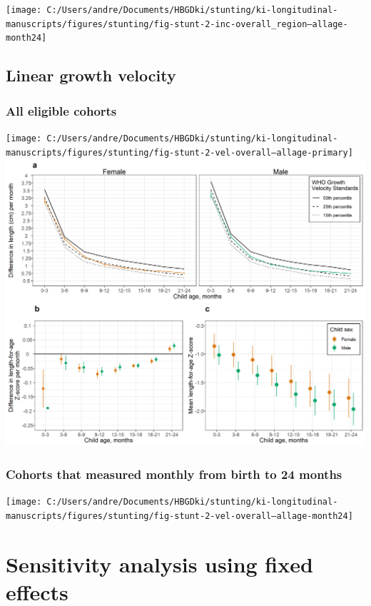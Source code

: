 \documentclass[9pt,]{book}
\begin{document}
\texttt{[image: C:/Users/andre/Documents/HBGDki/stunting/ki-longitudinal-manuscripts/figures/stunting/fig-stunt-2-inc-overall\_region--allage-month24]}

\section{Linear growth velocity}\label{linear-growth-velocity}

\subsection{All eligible cohorts}\label{all-eligible-cohorts-3}

\texttt{[image: C:/Users/andre/Documents/HBGDki/stunting/ki-longitudinal-manuscripts/figures/stunting/fig-stunt-2-vel-overall--allage-primary]}
\includegraphics[width=41.67in]{figure-copies/fig-stunt-2-vel-overall--allage-primary}

\subsection{Cohorts that measured monthly from birth to 24
months}\label{cohorts-that-measured-monthly-from-birth-to-24-months-3}

\texttt{[image: C:/Users/andre/Documents/HBGDki/stunting/ki-longitudinal-manuscripts/figures/stunting/fig-stunt-2-vel-overall--allage-month24]}

\chapter{Sensitivity analysis using fixed effects}\label{fixed-effects}
\end{document}
